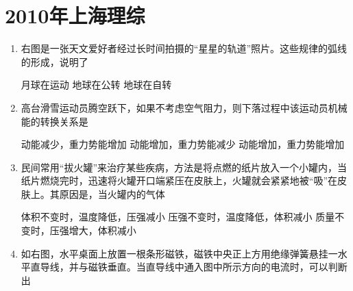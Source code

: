 \documentclass[\gkver]{gaokaozhenti}
\begin{document}
\chapter{2010年上海理综}

\begin{enumerate}
\item
右图是一张天文爱好者经过长时间拍摄的“星星的轨道”照片。这些规律的弧线的形成，说明了


{月球在运动}
{地球在公转}
{地球在自转}


\item
高台滑雪运动员腾空跃下，如果不考虑空气阻力，则下落过程中该运动员机械能的转换关系是

{动能减少，重力势能增加}
{动能增加，重力势能减少}
{动能增加，重力势能增加}


\item
民间常用“拔火罐”来治疗某些疾病，方法是将点燃的纸片放入一个小罐内，当纸片燃烧完时，迅速将火罐开口端紧压在皮肤上，火罐就会紧紧地被“吸”在皮肤上。其原因是，当火罐内的气体

{体积不变时，温度降低，压强减小}
{压强不变时，温度降低，体积减小}
{质量不变时，压强增大，体积减小}


\item
如右图，水平桌面上放置一根条形磁铁，磁铁中央正上方用绝缘弹簧悬挂一水平直导线，并与磁铁垂直。当直导线中通入图中所示方向的电流时，可以判断出


\end{enumerate}
\end{document}
